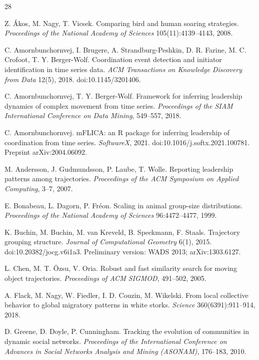 \begin{thebibliography}{28}
\small

 Z. Ákos, M. Nagy, T. Vicsek. Comparing bird and human soaring strategies.
\emph{Proceedings of the National Academy of Sciences} 105(11):4139--4143, 2008.

 C. Amornbunchornvej, I. Brugere, A. Strandburg-Peshkin, D. R. Farine,
M. C. Crofoot, T. Y. Berger-Wolf. Coordination event detection and initiator identification in time
series data. \emph{ACM Transactions on Knowledge Discovery from Data} 12(5), 2018.
doi:10.1145/3201406.

 C. Amornbunchornvej, T. Y. Berger-Wolf. Framework for inferring
leadership dynamics of complex movement from time series. \emph{Proceedings of the SIAM
International Conference on Data Mining}, 549--557, 2018.

 C. Amornbunchornvej. mFLICA: an R package for inferring leadership of
coordination from time series. \emph{SoftwareX}, 2021. doi:10.1016/j.softx.2021.100781. Preprint
arXiv:2004.06092.

 M. Andersson, J. Gudmundsson, P. Laube, T. Wolle. Reporting leadership
patterns among trajectories. \emph{Proceedings of the ACM Symposium on Applied Computing}, 3--7,
2007.

 E. Bonabeau, L. Dagorn, P. Fréon. Scaling in animal group-size distributions.
\emph{Proceedings of the National Academy of Sciences} 96:4472--4477, 1999.

 K. Buchin, M. Buchin, M. van Kreveld, B. Speckmann, F. Staals. Trajectory
grouping structure. \emph{Journal of Computational Geometry} 6(1), 2015.
doi:10.20382/jocg.v6i1a3. Preliminary version: WADS 2013; arXiv:1303.6127.

 L. Chen, M. T. Özsu, V. Oria. Robust and fast similarity search for moving
object trajectories. \emph{Proceedings of ACM SIGMOD}, 491--502, 2005.

 A. Flack, M. Nagy, W. Fiedler, I. D. Couzin, M. Wikelski. From local collective
behavior to global migratory patterns in white storks. \emph{Science} 360(6391):911--914, 2018.

 D. Greene, D. Doyle, P. Cunningham. Tracking the evolution of communities in
dynamic social networks. \emph{Proceedings of the International Conference on Advances in Social
Networks Analysis and Mining (ASONAM)}, 176--183, 2010.


\end{thebibliography}

